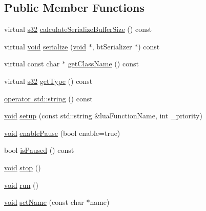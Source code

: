 \subsection*{Public Member Functions}
\begin{DoxyCompactItemize}
\item 
virtual \mbox{\hyperlink{_util_8h_aa62c75d314a0d1f37f79c4b73b2292e2}{s32}} \mbox{\hyperlink{classnjli_1_1_thread_aa3b2e7df4ade1f690d8325d788c67bef}{calculate\+Serialize\+Buffer\+Size}} () const
\item 
virtual \mbox{\hyperlink{_thread_8h_af1e856da2e658414cb2456cb6f7ebc66}{void}} \mbox{\hyperlink{classnjli_1_1_thread_ae1acf75828f1ab2ee4a0f818dc849292}{serialize}} (\mbox{\hyperlink{_thread_8h_af1e856da2e658414cb2456cb6f7ebc66}{void}} $\ast$, bt\+Serializer $\ast$) const
\item 
virtual const char $\ast$ \mbox{\hyperlink{classnjli_1_1_thread_a212e294b12cb653e82d9e4ab96ebf006}{get\+Class\+Name}} () const
\item 
virtual \mbox{\hyperlink{_util_8h_aa62c75d314a0d1f37f79c4b73b2292e2}{s32}} \mbox{\hyperlink{classnjli_1_1_thread_a38cbb608d012da083fd9d35ed87ba277}{get\+Type}} () const
\item 
\mbox{\hyperlink{classnjli_1_1_thread_ad44cbca3ce255ac199d745ea3bd072de}{operator std\+::string}} () const
\item 
\mbox{\hyperlink{_thread_8h_af1e856da2e658414cb2456cb6f7ebc66}{void}} \mbox{\hyperlink{classnjli_1_1_thread_a644871703e3eaa5f500f8ee9d38e64b9}{setup}} (const std\+::string \&lua\+Function\+Name, int \+\_\+priority)
\item 
\mbox{\hyperlink{_thread_8h_af1e856da2e658414cb2456cb6f7ebc66}{void}} \mbox{\hyperlink{classnjli_1_1_thread_add29f8799756f141a64f8b559445aa72}{enable\+Pause}} (bool enable=true)
\item 
bool \mbox{\hyperlink{classnjli_1_1_thread_ab0d4353d5fbca34da213eb4cbeb8bfe3}{is\+Paused}} () const
\item 
\mbox{\hyperlink{_thread_8h_af1e856da2e658414cb2456cb6f7ebc66}{void}} \mbox{\hyperlink{classnjli_1_1_thread_a337a98642b6c61d7af26ecc942b7d12c}{stop}} ()
\item 
\mbox{\hyperlink{_thread_8h_af1e856da2e658414cb2456cb6f7ebc66}{void}} \mbox{\hyperlink{classnjli_1_1_thread_a14bd06414dc70facee0ec6840ab52c7b}{run}} ()
\item 
\mbox{\hyperlink{_thread_8h_af1e856da2e658414cb2456cb6f7ebc66}{void}} \mbox{\hyperlink{classnjli_1_1_thread_a087eb5f8d9f51cc476f12f1d10a3cb95}{set\+Name}} (const char $\ast$name)

\end{DoxyCompactItemize}
